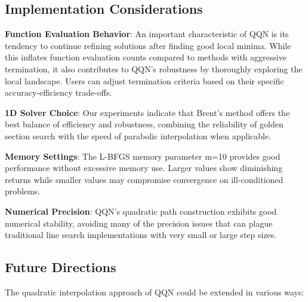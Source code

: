 \hypertarget{implementation-considerations}{%
\subsection{Implementation Considerations}\label{implementation-considerations}}

\textbf{Function Evaluation Behavior}: An important characteristic of QQN is its tendency to continue refining solutions after finding good local minima.
While this inflates function evaluation counts compared to methods with aggressive termination, it also contributes to QQN's robustness by thoroughly exploring the local landscape.
Users can adjust termination criteria based on their specific accuracy-efficiency trade-offs.

\textbf{1D Solver Choice}: Our experiments indicate that Brent's method offers the best balance of efficiency and robustness, combining the reliability of golden section search with the speed of parabolic interpolation when applicable.

\textbf{Memory Settings}: The L-BFGS memory parameter m=10 provides good performance without excessive memory use.
Larger values show diminishing returns while smaller values may compromise convergence on ill-conditioned problems.

\textbf{Numerical Precision}: QQN's quadratic path construction exhibits good numerical stability, avoiding many of the precision issues that can plague traditional line search implementations with very small or large step sizes.

\hypertarget{future-directions}{%
\subsection{Future Directions}\label{future-directions}}

The quadratic interpolation approach of QQN could be extended in various ways:

